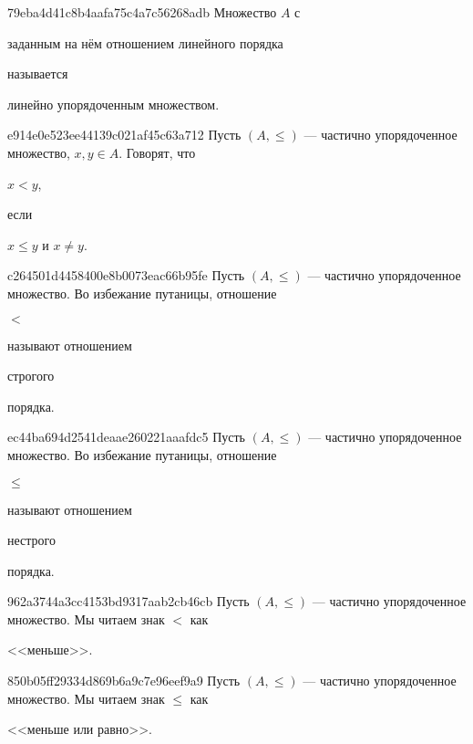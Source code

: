 \begin{note}{79eba4d41c8b4aafa75c4a7c56268adb}
    Множество \({ A }\) с \begin{icloze}{2}заданным на нём отношением линейного порядка\end{icloze} называется \begin{icloze}{1}линейно упорядоченным множеством.\end{icloze}
\end{note}

\begin{note}{e914e0e523ee44139c021af45c63a712}
    Пусть \({ (A, \leqslant) }\) --- частично упорядоченное множество, \({ x, y \in A }\).
    Говорят, что \begin{icloze}{2}\({ x < y }\),\end{icloze} если \begin{icloze}{1}\({ x \leqslant y }\) и \({ x \neq y }\).\end{icloze}
\end{note}

\begin{note}{c264501d4458400e8b0073eac66b95fe}
    Пусть \({ (A, \leqslant) }\) --- частично упорядоченное множество.
    Во избежание путаницы, отношение \begin{icloze}{2}\({ < }\)\end{icloze} называют отношением \begin{icloze}{1}строгого\end{icloze} порядка.
\end{note}

\begin{note}{ec44ba694d2541deaae260221aaafdc5}
    Пусть \({ (A, \leqslant) }\) --- частично упорядоченное множество.
    Во избежание путаницы, отношение \begin{icloze}{2}\({ \leqslant }\)\end{icloze} называют отношением \begin{icloze}{1}нестрого\end{icloze} порядка.
\end{note}

\begin{note}{962a3744a3cc4153bd9317aab2cb46cb}
    Пусть \({ (A, \leqslant) }\) --- частично упорядоченное множество.
    Мы читаем знак \({ < }\) как \begin{icloze}{1}<<меньше>>.\end{icloze}
\end{note}

\begin{note}{850b05ff29334d869b6a9c7e96eef9a9}
    Пусть \({ (A, \leqslant) }\) --- частично упорядоченное множество.
    Мы читаем знак \({ \leqslant }\) как \begin{icloze}{1}<<меньше или равно>>.\end{icloze}
\end{note}


